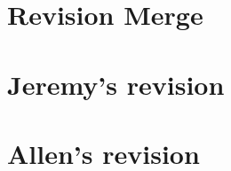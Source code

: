 \documentclass[reqno, oneside]{amsart}
\theoremstyle{definition}
\newtheorem{dfn}[nul]{Definition}
\theoremstyle{plain}
\begin{document}


\section{Revision Merge}



\section{Jeremy's revision}



\section{Allen's revision}
\begin{comment}
\begin{dfn}
The \textit{Ran space} $\text{Ran}(\mathbb{A}^1)$ is the presheaf that assigns to every $\mathbb{C}$-algebra $R$ the set of non-empty finite subsets of $\text{Spec}(R) \times \mathbb{A}^1$.   The Beilinson--Drinfeld Grassmannian is the presheaf $Gr_{G,Ran}$ that assigns to each $\mathbb{C}$-algebra $R$ the set of triplets $(x,\mathcal{E},\beta)$, where $x \in \text{Ran}(\mathbb{A}^1)(R)$, $\mathcal{E}$ is a $G$-torsor on $\mathbb{A}^1 \times \text{Spec}(R)$, and $\beta$ is a trivialization of $\mathcal{E}$ away from the graph of $x$ in $\text{Spec}(R) \times \mathbb{A}^1 $.
\end{dfn}



One thinks of the Beilinson--Drinfeld Grassmannian as fibered over the Ran space.  In other words, for every finite collection of points $I \subset \mathbb{A}^1$, there is a corresponding point $x$ in the Ran space.  The fiber of the Beilinson--Drinfeld Grassmannian over $x$ is the moduli of $G$-bundles on $\mathbb{A}^1$ equipped with a trivialization away from the points in $I$.  This fiber is naturally isomorphic to the product of $|I|$ copies of $Gr_G$.  The multiplication on $Gr_G$ is encoded by degeneration of fibers as points collide in $\mathbb{A}^1$.  For more details, see \cite[\S 3]{Zhu}.

The connection of the above structure with the notion of $\mathbb{E}_2$-algebra in homotopy theory was spelled out explicitly by Jacob Lurie in \cite[\S 5.5]{HA}.  Our next goal is to explain this connection; we refer the reader to \cite[\S 5.5]{HA} for the precise definitions.  


\end{comment}
\end{document}
